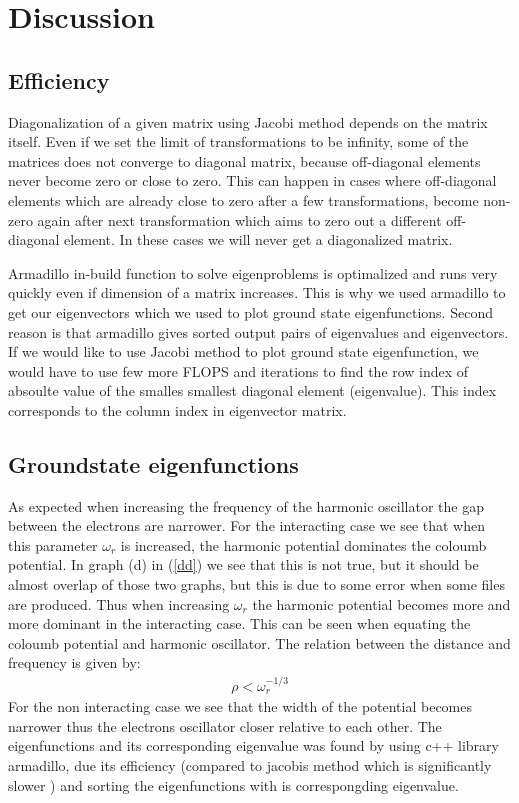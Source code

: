 \documentclass[a4paper, 10pt]{article}
\begin{document}
\section{Discussion}
\subsection{Efficiency}
Diagonalization of a given matrix using Jacobi method depends on the matrix
itself. Even if we set the limit of transformations to be infinity, some of the
matrices does not converge to diagonal matrix, because off-diagonal elements
never become zero or close to zero. This can happen in cases where off-diagonal
elements which are already close to zero after a few transformations, become
non-zero again after next transformation which aims to zero out a different
off-diagonal element. In these cases we will never get a diagonalized matrix.

Armadillo in-build function to solve eigenproblems is optimalized and runs very
quickly even if dimension of a matrix increases. This is why we used armadillo
to get our eigenvectors which we used to plot ground state eigenfunctions.
Second reason is that armadillo gives sorted output pairs of eigenvalues and
eigenvectors. If we would like to use Jacobi method to plot ground state
eigenfunction, we would have to use few more FLOPS and iterations to find the
row index of absoulte value of the smalles smallest diagonal element
(eigenvalue). This index corresponds to the column index in eigenvector matrix.

\subsection{Groundstate eigenfunctions} As expected when increasing the frequency of
the harmonic oscillator the gap between the electrons are narrower. For the interacting
case we see that when this parameter $\omega_{r}$ is increased, the harmonic potential
dominates the coloumb potential. In graph (d) in (\ref{dd}) we see that this is not true,
but it should be almost overlap of those two graphs, but this is due to some error when some files are
produced. Thus when increasing $\omega_{r}$ the harmonic potential becomes more and more
dominant in the interacting case. This can be seen when equating the coloumb potential and
harmonic oscillator. The relation between the distance and frequency is given by:
\begin{align}
  \rho < \omega_{r}^{-1/3}
\end{align}
For the non interacting case we see that the
width of the potential becomes narrower thus the electrons oscillator closer relative to each other. The eigenfunctions and its corresponding
eigenvalue was found by using c++ library armadillo, due its efficiency (compared to jacobis method which is significantly slower )
and sorting the eigenfunctions with is correspongding eigenvalue.
\end{document}
